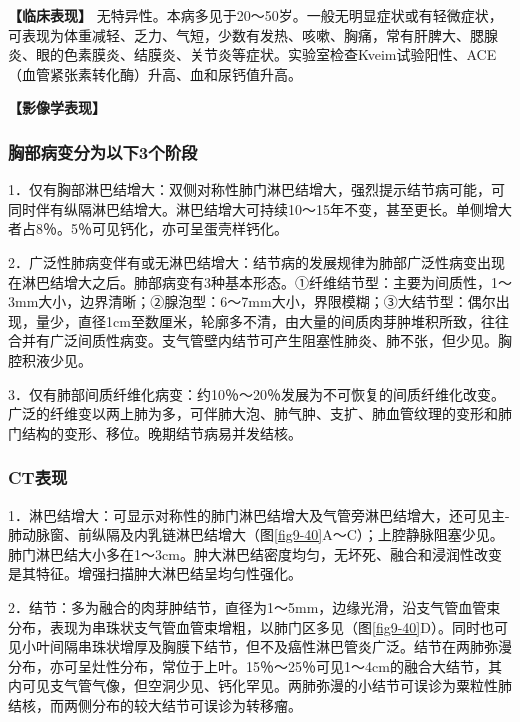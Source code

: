 \textbf{【临床表现】}
无特异性。本病多见于20～50岁。一般无明显症状或有轻微症状，可表现为体重减轻、乏力、气短，少数有发热、咳嗽、胸痛，常有肝脾大、腮腺炎、眼的色素膜炎、结膜炎、关节炎等症状。实验室检查Kveim试验阳性、ACE（血管紧张素转化酶）升高、血和尿钙值升高。

\textbf{【影像学表现】}

\subsubsection{胸部病变分为以下3个阶段}

1．仅有胸部淋巴结增大：双侧对称性肺门淋巴结增大，强烈提示结节病可能，可同时伴有纵隔淋巴结增大。淋巴结增大可持续10～15年不变，甚至更长。单侧增大者占8％。5％可见钙化，亦可呈蛋壳样钙化。

2．广泛性肺病变伴有或无淋巴结增大：结节病的发展规律为肺部广泛性病变出现在淋巴结增大之后。肺部病变有3种基本形态。①纤维结节型：主要为间质性，1～3mm大小，边界清晰；②腺泡型：6～7mm大小，界限模糊；③大结节型：偶尔出现，量少，直径1cm至数厘米，轮廓多不清，由大量的间质肉芽肿堆积所致，往往合并有广泛间质性病变。支气管壁内结节可产生阻塞性肺炎、肺不张，但少见。胸腔积液少见。

3．仅有肺部间质纤维化病变：约10％～20％发展为不可恢复的间质纤维化改变。广泛的纤维变以两上肺为多，可伴肺大泡、肺气肿、支扩、肺血管纹理的变形和肺门结构的变形、移位。晚期结节病易并发结核。

\subsubsection{CT表现}

1．淋巴结增大：可显示对称性的肺门淋巴结增大及气管旁淋巴结增大，还可见主-肺动脉窗、前纵隔及内乳链淋巴结增大（图\ref{fig9-40}A～C）；上腔静脉阻塞少见。肺门淋巴结大小多在1～3cm。肿大淋巴结密度均匀，无坏死、融合和浸润性改变是其特征。增强扫描肿大淋巴结呈均匀性强化。

2．结节：多为融合的肉芽肿结节，直径为1～5mm，边缘光滑，沿支气管血管束分布，表现为串珠状支气管血管束增粗，以肺门区多见（图\ref{fig9-40}D）。同时也可见小叶间隔串珠状增厚及胸膜下结节，但不及癌性淋巴管炎广泛。结节在两肺弥漫分布，亦可呈灶性分布，常位于上叶。15％～25％可见1～4cm的融合大结节，其内可见支气管气像，但空洞少见、钙化罕见。两肺弥漫的小结节可误诊为粟粒性肺结核，而两侧分布的较大结节可误诊为转移瘤。

